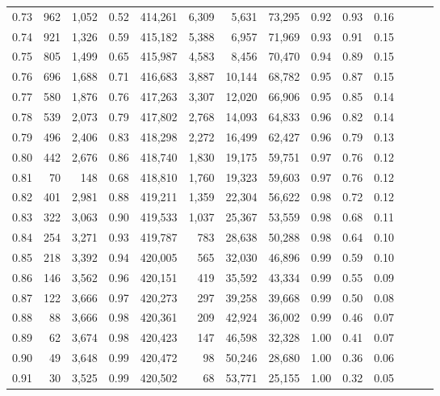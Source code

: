 \begin{tabular}{rrrrrrrrrrrrrr}
0.73 &    962 &  1,052 &  0.52 &  414,261 &    6,309 &   5,631 &  73,295 &  0.92 &  0.93 &      0.16 \\
0.74 &    921 &  1,326 &  0.59 &  415,182 &    5,388 &   6,957 &  71,969 &  0.93 &  0.91 &      0.15 \\
0.75 &    805 &  1,499 &  0.65 &  415,987 &    4,583 &   8,456 &  70,470 &  0.94 &  0.89 &      0.15 \\
0.76 &    696 &  1,688 &  0.71 &  416,683 &    3,887 &  10,144 &  68,782 &  0.95 &  0.87 &      0.15 \\
0.77 &    580 &  1,876 &  0.76 &  417,263 &    3,307 &  12,020 &  66,906 &  0.95 &  0.85 &      0.14 \\
0.78 &    539 &  2,073 &  0.79 &  417,802 &    2,768 &  14,093 &  64,833 &  0.96 &  0.82 &      0.14 \\
0.79 &    496 &  2,406 &  0.83 &  418,298 &    2,272 &  16,499 &  62,427 &  0.96 &  0.79 &      0.13 \\
0.80 &    442 &  2,676 &  0.86 &  418,740 &    1,830 &  19,175 &  59,751 &  0.97 &  0.76 &      0.12 \\
0.81 &     70 &    148 &  0.68 &  418,810 &    1,760 &  19,323 &  59,603 &  0.97 &  0.76 &      0.12 \\
0.82 &    401 &  2,981 &  0.88 &  419,211 &    1,359 &  22,304 &  56,622 &  0.98 &  0.72 &      0.12 \\
0.83 &    322 &  3,063 &  0.90 &  419,533 &    1,037 &  25,367 &  53,559 &  0.98 &  0.68 &      0.11 \\
0.84 &    254 &  3,271 &  0.93 &  419,787 &      783 &  28,638 &  50,288 &  0.98 &  0.64 &      0.10 \\
0.85 &    218 &  3,392 &  0.94 &  420,005 &      565 &  32,030 &  46,896 &  0.99 &  0.59 &      0.10 \\
0.86 &    146 &  3,562 &  0.96 &  420,151 &      419 &  35,592 &  43,334 &  0.99 &  0.55 &      0.09 \\
0.87 &    122 &  3,666 &  0.97 &  420,273 &      297 &  39,258 &  39,668 &  0.99 &  0.50 &      0.08 \\
0.88 &     88 &  3,666 &  0.98 &  420,361 &      209 &  42,924 &  36,002 &  0.99 &  0.46 &      0.07 \\
0.89 &     62 &  3,674 &  0.98 &  420,423 &      147 &  46,598 &  32,328 &  1.00 &  0.41 &      0.07 \\
0.90 &     49 &  3,648 &  0.99 &  420,472 &       98 &  50,246 &  28,680 &  1.00 &  0.36 &      0.06 \\
0.91 &     30 &  3,525 &  0.99 &  420,502 &       68 &  53,771 &  25,155 &  1.00 &  0.32 &      0.05 \\

\end{tabular}
